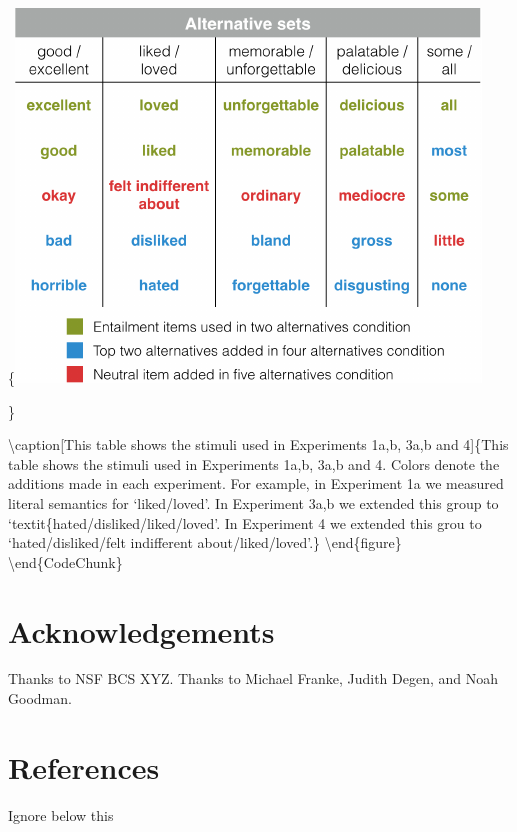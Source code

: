 \documentclass[10pt, letterpaper]{article}
\begin{document}
\{\centering \includegraphics{figs/allScalesTable-1}

\}

\textbackslash{}caption{[}This table shows the stimuli used in
Experiments 1a,b, 3a,b and 4{]}\{This table shows the stimuli used in
Experiments 1a,b, 3a,b and 4. Colors denote the additions made in each
experiment. For example, in Experiment 1a we measured literal semantics
for `liked/loved'. In Experiment 3a,b we extended this group to
`textit\{hated/disliked/liked/loved'. In Experiment 4 we extended this
grou to `hated/disliked/felt indifferent
about/liked/loved'.\}\label{fig:allScalesTable}
\textbackslash{}end\{figure\} \textbackslash{}end\{CodeChunk\}

\section{Acknowledgements}\label{acknowledgements}

Thanks to NSF BCS XYZ. Thanks to Michael Franke, Judith Degen, and Noah
Goodman.

\section{References}\label{references}

\setlength{\parindent}{-0.1in} \setlength{\leftskip}{0.125in} \noindent

Ignore below this
\end{document}

